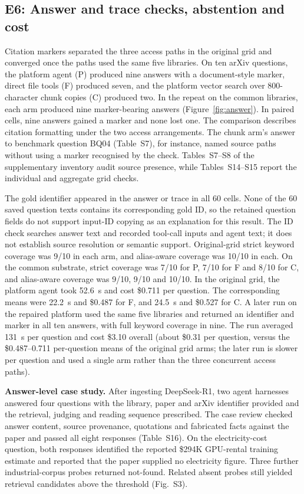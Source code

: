\subsection{E6: Answer and trace checks, abstention and cost}
\label{sec:e5}
\label{sec:agentic}\label{sec:abstention}\label{sec:composition}\label{sec:eval-agent}
Citation markers separated the three access paths in the original grid
and converged once the paths used the same five libraries. On ten arXiv
questions, the platform agent (P) produced nine answers with a
document-style marker, direct file tools (F) produced seven, and the
platform vector search over 800-character chunk copies (C) produced two.
In the repeat on the common libraries, each arm produced nine marker-bearing
answers (Figure~\ref{fig:answer}). In paired cells, nine answers gained a
marker and none lost one. The comparison describes citation formatting
under the two access arrangements. The chunk arm's answer to benchmark question BQ04 (Table~S7), for
instance, named source paths without using a marker recognised by the
check. Tables~S7--S8 of the supplementary inventory audit source presence,
while Tables~S14--S15 report the individual and aggregate grid checks.

The gold identifier appeared in the answer or trace in all 60 cells.
None of the 60 saved question texts contains its corresponding gold ID, so
the retained question fields do not support input-ID copying as an explanation
for this result. The ID check searches answer text and recorded tool-call
inputs and agent text; it does not establish source resolution or semantic
support. Original-grid strict keyword coverage was 9/10 in each arm, and
alias-aware coverage was 10/10 in each. On the common substrate, strict
coverage was
7/10 for P, 7/10 for F and 8/10 for C, and alias-aware coverage was
9/10, 9/10 and 10/10. In the original grid, the platform agent took
52.6~s and cost \$0.711 per question. The corresponding means were 22.2~s
and \$0.487 for F, and 24.5~s and \$0.527 for C. A later run on the
repaired platform used the same five libraries and returned an identifier
and marker in all ten answers, with full keyword coverage in nine.
The run averaged 131~s per question and cost \$3.10 overall
(about \$0.31 per question, versus the \$0.487--0.711 per-question means
of the original grid arms; the later run is slower per question and used
a single arm rather than the three concurrent access paths).

\textbf{Answer-level case study.} After ingesting DeepSeek-R1, two agent
harnesses answered four questions with the library, paper and arXiv identifier
provided and the retrieval, judging and reading sequence prescribed.
The case review checked answer content, source provenance, quotations
and fabricated facts against the paper and passed all eight responses
(Table~S16). On the electricity-cost question, both responses identified
the reported \$294K GPU-rental training estimate and reported that the
paper supplied no electricity figure. Three further industrial-corpus
probes returned not-found. Related absent probes still yielded retrieval
candidates above the threshold (Fig.~S3).

